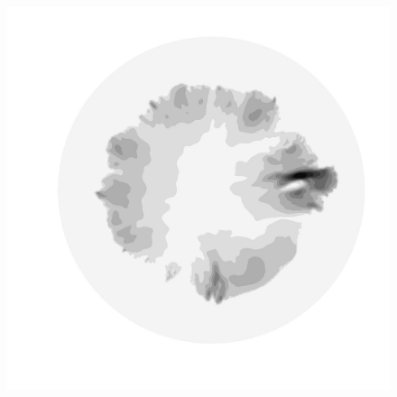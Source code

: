 \begin{figure}
\begin{minipage}[b]{0.30\linewidth}
  \end{minipage}
  \quad
  \begin{minipage}[b]{0.30\linewidth}
    \includegraphics[width=1.0\textwidth]{images/EISMINT_II/Ubar/U_mag_10000.jpg}
  \end{minipage}
  

\end{figure}
